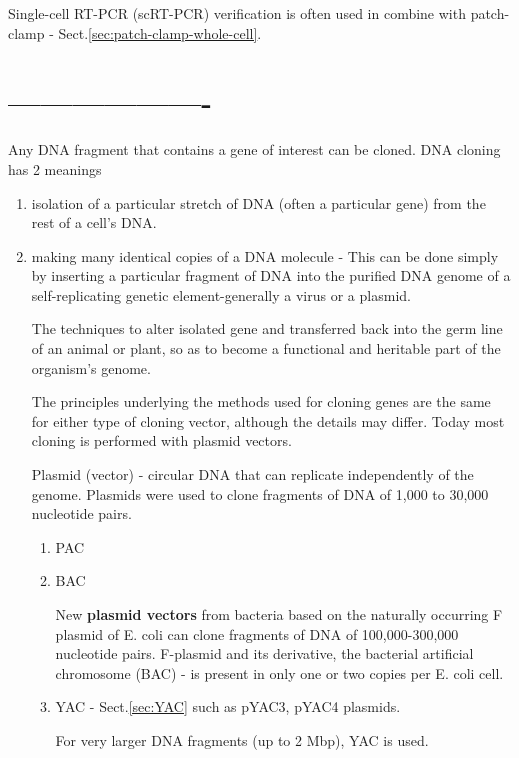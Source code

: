 Single-cell RT-PCR (scRT-PCR) verification is often used in combine with
patch-clamp - Sect.\ref{sec:patch-clamp-whole-cell}.


\section{-------------------}
\label{sec:techniques-clone-DNA}

Any DNA fragment that contains a gene of interest can be cloned. DNA cloning has
2 meanings
\begin{enumerate}
  \item isolation of a particular stretch of DNA (often a particular gene) from
  the rest of a cell's DNA.

  \item making many identical copies of a DNA molecule - This can be done simply
  by inserting a particular fragment of DNA into the purified DNA genome of a
  self-replicating genetic element-generally a virus or a plasmid.

The techniques to alter isolated gene and transferred back into the
germ line of an animal or plant, so as to become a functional and heritable part
of the organism's genome. 

The principles underlying the methods used for cloning genes are the same for
either type of cloning vector, although the details may differ. Today most
cloning is performed with plasmid vectors.

Plasmid (vector) - circular DNA that can replicate independently of the genome.
Plasmids were used to clone fragments of DNA of 1,000 to 30,000 nucleotide
pairs. 
\begin{enumerate}
  \item PAC
  \item BAC
  
New {\bf plasmid vectors} from bacteria based on the naturally occurring F
plasmid of E. coli can clone fragments of DNA of 100,000-300,000 nucleotide
pairs. F-plasmid and its derivative, the bacterial artificial chromosome (BAC) -
is present in only one or two copies per E. coli cell.

  \item YAC - Sect.\ref{sec:YAC} such as pYAC3, pYAC4 plasmids.
  
  For very larger DNA fragments (up to 2 Mbp), YAC is used.
  
\end{enumerate}
\end{enumerate}

